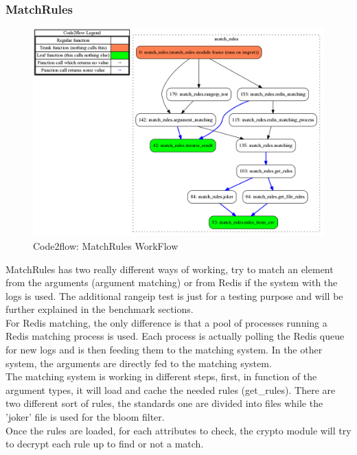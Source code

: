 \documentclass{eplmastersthesis}
\begin{document}
\subsubsection{MatchRules}
\begin{figure}[h!]
\begin{center}
	\includegraphics[scale=0.3]{res/flowMatchRules}
	\caption{Code2flow: MatchRules WorkFlow}
	\label{code2flow-matchRules}
\end{center}
\end{figure}

MatchRules has two really different ways of working, try to match an element from the arguments (argument matching) or from Redis if the system with the logs is used.
The additional rangeip test is just for a testing purpose and will be further explained in the benchmark sections.\\

For Redis matching, the only difference is that a pool of processes running a Redis matching process is used.
Each process is actually polling the Redis queue for new logs and is then feeding them to the matching system.
In the other system, the arguments are directly fed to the matching system.\\

The matching system is working in different steps, first, in function of the argument types, it will load and cache the needed rules (get\_rules).
There are two different sort of rules, the standards one are divided into files while the 'joker' file is used for the bloom filter.\\

Once the rules are loaded, for each attributes to check, the crypto module will try to decrypt each rule up to find or not a match.
\end{document}
